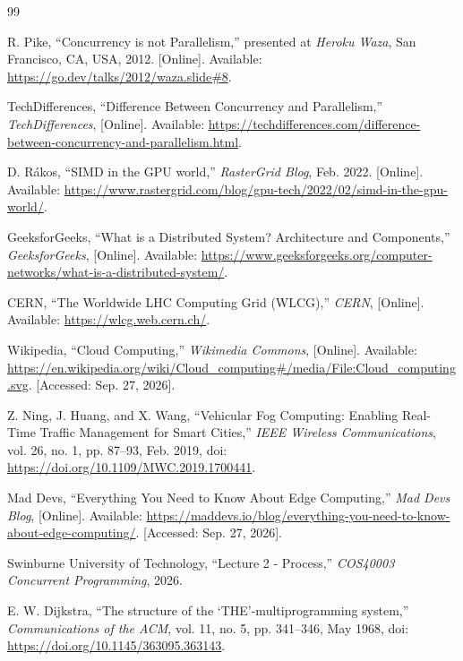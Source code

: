 \documentclass[conference]{IEEEtran}
\begin{document}
\begin{thebibliography}{99}
\raggedright

R. Pike, ``Concurrency is not Parallelism,'' presented at \emph{Heroku Waza}, San Francisco, CA, USA, 2012. [Online]. Available: \url{https://go.dev/talks/2012/waza.slide#8}. 

TechDifferences, ``Difference Between Concurrency and Parallelism,'' \emph{TechDifferences}, [Online]. Available: \url{https://techdifferences.com/difference-between-concurrency-and-parallelism.html}. 

D. Rákos, ``SIMD in the GPU world,'' \emph{RasterGrid Blog}, Feb. 2022. [Online]. Available: \url{https://www.rastergrid.com/blog/gpu-tech/2022/02/simd-in-the-gpu-world/}. 

GeeksforGeeks, ``What is a Distributed System? Architecture and Components,'' \emph{GeeksforGeeks}, [Online]. Available: \url{https://www.geeksforgeeks.org/computer-networks/what-is-a-distributed-system/}. 

CERN, ``The Worldwide LHC Computing Grid (WLCG),'' \emph{CERN}, [Online]. Available: \url{https://wlcg.web.cern.ch/}. 

Wikipedia, ``Cloud Computing,'' \emph{Wikimedia Commons}, [Online]. Available: \url{https://en.wikipedia.org/wiki/Cloud_computing#/media/File:Cloud_computing.svg}. [Accessed: Sep. 27, 2026].

Z. Ning, J. Huang, and X. Wang, ``Vehicular Fog Computing: Enabling Real-Time Traffic Management for Smart Cities,'' \emph{IEEE Wireless Communications}, vol. 26, no. 1, pp. 87--93, Feb. 2019, doi: \url{https://doi.org/10.1109/MWC.2019.1700441}.

Mad Devs, ``Everything You Need to Know About Edge Computing,'' \emph{Mad Devs Blog}, [Online]. Available: \url{https://maddevs.io/blog/everything-you-need-to-know-about-edge-computing/}. [Accessed: Sep. 27, 2026].

Swinburne University of Technology, ``Lecture 2 - Process,'' \emph{COS40003 Concurrent Programming}, 2026.

E. W. Dijkstra, ``The structure of the `THE'-multiprogramming system,'' \emph{Communications of the ACM}, vol. 11, no. 5, pp. 341--346, May 1968, doi: \url{https://doi.org/10.1145/363095.363143}.


\end{thebibliography}
\end{document}
